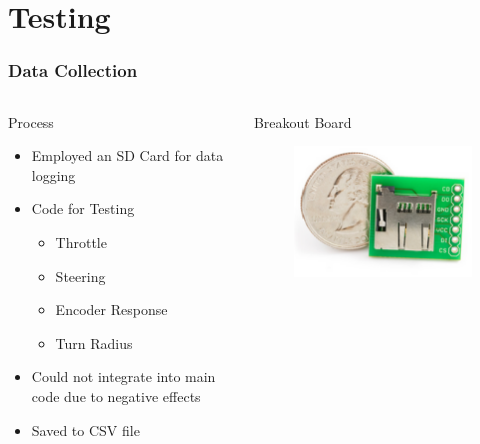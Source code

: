 \documentclass{beamer}
\begin{document}
\section{Testing}
\begin{frame}
	\frametitle{Data Collection}
	\begin{columns}[T]
		\begin{column}{0.5\textwidth}
			\begin{block}{Process}
				\begin{itemize}
					\item Employed an SD Card for data logging
					\item Code for Testing
					\begin{itemize}
						\item Throttle
						\item Steering
						\item Encoder Response
						\item Turn Radius
					\end{itemize}
					\item Could not integrate into main code due to negative effects
					\item Saved to CSV file
				\end{itemize}
			\end{block}
		\end{column}		
		\begin{column}{0.5\textwidth}
			\begin{block}{Breakout Board}
				\begin{figure}
					\centering
					\includegraphics[scale=.9]{figures/sdcard.pdf}
				\end{figure}
			\end{block}	
		\end{column}
	\end{columns}		
\end{frame}
\end{document}
